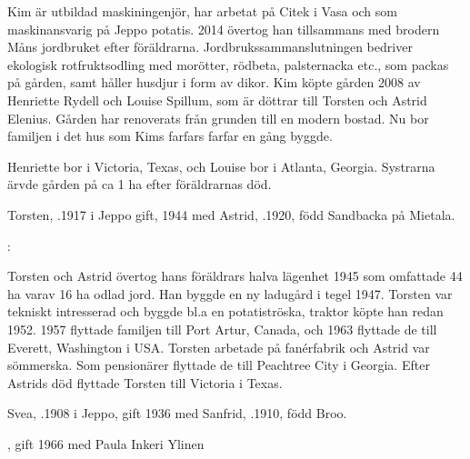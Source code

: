 Kim är utbildad maskiningenjör, har arbetat på Citek i Vasa och som maskinansvarig på Jeppo potatis. 2014 övertog han tillsammans med brodern Måns jordbruket efter föräldrarna. Jordbrukssammanslutningen bedriver ekologisk rotfruktsodling med morötter, rödbeta, palsternacka etc., som packas på gården, samt håller husdjur i form av dikor. Kim köpte gården 2008 av Henriette Rydell och Louise Spillum, som är döttrar till Torsten och Astrid Elenius. Gården har renoverats från grunden till en modern bostad. Nu bor familjen i det hus som Kims farfars farfar en gång byggde.


%
Henriette bor i Victoria, Texas, och Louise bor i Atlanta, Georgia. Systrarna ärvde gården på ca 1 ha efter föräldrarnas död.\jhvspace{}


%
Torsten, .1917 i Jeppo gift, 1944 med Astrid, .1920, född Sandbacka på Mietala.
\begin{jhchildren}
  \item {}
  \item {}
\end{jhchildren}
:

Torsten och Astrid övertog hans föräldrars halva lägenhet 1945 som 	omfattade 44 ha varav 16 ha odlad jord. Han byggde en ny ladugård i tegel 1947. Torsten var tekniskt intresserad och byggde bl.a en potatiströska, traktor köpte han redan 1952. 1957 flyttade familjen till Port Artur, Canada, och 1963 flyttade de till Everett, Washington i USA. Torsten arbetade på fanérfabrik och Astrid var sömmerska. Som pensionärer flyttade de till Peachtree City i Georgia. Efter Astrids död flyttade Torsten till Victoria i Texas.


%
Svea, .1908 i Jeppo, gift 1936 med Sanfrid, .1910, född Broo.
\begin{jhchildren}
  \item {}
  \item {}
  \item {}, gift 1966 med Paula Inkeri Ylinen
\end{jhchildren}

